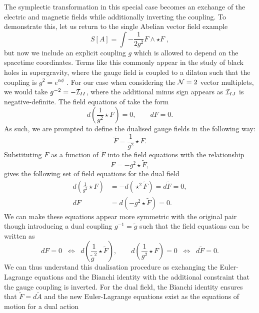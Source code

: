 The symplectic transformation in this special case becomes an exchange of the electric and magnetic fields while additionally inverting the coupling. To demonstrate this, let us return to the single Abelian vector field example 
\begin{equation}
\label{eq:maxwellgen}
S[A] = \int - \frac{1}{2g^2} F \wedge \star F \;,
\end{equation}
but now we include an explicit coupling $g$ which is allowed to depend on the spacetime coordinates. Terms like this commonly appear in the study of black holes in supergravity, where the gauge field is coupled to a dilaton such that the coupling is $g^2 = e^{\alpha \phi}$ \cite{Horne:1992bi, Horowitz:1992jp}. For our case when considering the ${\cal N} = 2$ vector multiplets, we would take $g^{-2} = -{\cal I}_{II}$, where the additional minus sign appears as ${\cal I}_{IJ}$ is negative-definite. The field equations of  take the form
\begin{equation}
	d \left( \frac{1}{g^2} \star F \right) = 0, \qquad d F = 0.
\end{equation}
As such, we are prompted to define the dualised gauge fields in the following way:
\begin{equation*}
	\tilde{F} = \frac{1}{g^2}  \star F.
\end{equation*}
Substituting $F$ as a function of $\tilde{F}$ into the field equations with the relationship
\begin{equation*}
	F = - g^2 \star \tilde{F},
\end{equation*}
gives the following set of field equations for the dual field
\begin{equation*}
	\begin{aligned}
		d \left( \frac{1}{g^2} \star F \right) &= - d \left( \star^2 \tilde{F} \right) = d \tilde{F} = 0,\\
		d F &= d \left(- g^2 \star \tilde{F} \right) = 0.
	\end{aligned}
\end{equation*}
We can make these equations appear more symmetric with the original pair though introducing a dual coupling $g^{-1} = \tilde{g}$ such that the field equations can be written as
\begin{equation*}
	dF = 0 \;\; \Leftrightarrow \;\; d \left( \frac{1}{\tilde{g}^2} \star \tilde{F} \right), \qquad	d \left( \frac{1}{g^2} \star F \right)  = 0 \;\; \Leftrightarrow \;\; d\tilde{F} = 0 .
\end{equation*}
We can thus understand this dualisation procedure as exchanging the Euler-Lagrange equations and the Bianchi identity with the additional constraint that the gauge coupling is inverted. For the dual field, the Bianchi identity ensures that $\tilde{F} = d\tilde{A}$ and the new Euler-Lagrange equations exist as the equations of motion for a dual action
